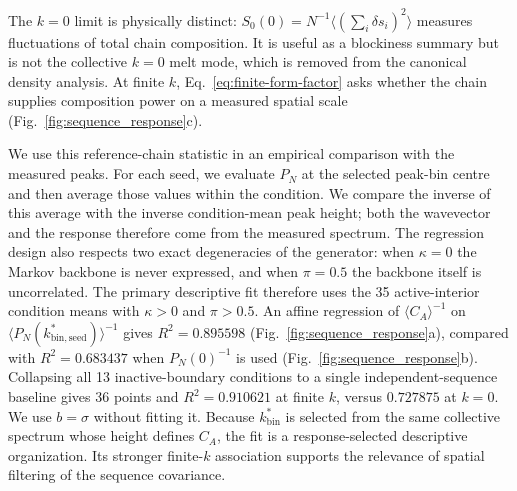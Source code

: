 \documentclass[pdflatex,sn-nature,onecolumn]{sn-jnl}
\begin{document}
The $k=0$ limit is physically distinct: $S_0(0)=N^{-1}\langle(\sum_i\delta s_i)^2\rangle$ measures fluctuations of total chain composition. It is useful as a blockiness summary but is not the collective $k=0$ melt mode, which is removed from the canonical density analysis. At finite $k$, Eq.~\ref{eq:finite-form-factor} asks whether the chain supplies composition power on a measured spatial scale (Fig.~\ref{fig:sequence_response}c).

We use this reference-chain statistic in an empirical comparison with the measured peaks. For each seed, we evaluate $P_N$ at the selected peak-bin centre and then average those values within the condition. We compare the inverse of this average with the inverse condition-mean peak height; both the wavevector and the response therefore come from the measured spectrum. The regression design also respects two exact degeneracies of the generator: when $\kappa=0$ the Markov backbone is never expressed, and when $\pi=0.5$ the backbone itself is uncorrelated. The primary descriptive fit therefore uses the 35 active-interior condition means with $\kappa>0$ and $\pi>0.5$. An affine regression of $\langle C_A\rangle^{-1}$ on $\langle P_N(k_{\mathrm{bin,seed}}^*)\rangle^{-1}$ gives $R^2=0.895598$ (Fig.~\ref{fig:sequence_response}a), compared with $R^2=0.683437$ when $P_N(0)^{-1}$ is used (Fig.~\ref{fig:sequence_response}b). Collapsing all 13 inactive-boundary conditions to a single independent-sequence baseline gives 36 points and $R^2=0.910621$ at finite $k$, versus $0.727875$ at $k=0$. We use $b=\sigma$ without fitting it. Because $k_{\mathrm{bin}}^*$ is selected from the same collective spectrum whose height defines $C_A$, the fit is a response-selected descriptive organization. Its stronger finite-$k$ association supports the relevance of spatial filtering of the sequence covariance.
\end{document}
